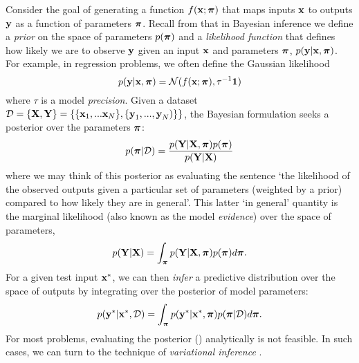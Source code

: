 Consider the goal of generating a function $f(\boldsymbol{\mathbf{x}}; \boldsymbol{\mathbf{\pi}})$ that maps inputs $\boldsymbol{\mathbf{x}}$ to outputs $\boldsymbol{\mathbf{y}}$ as a function of parameters $\boldsymbol{\mathbf{\pi}}$. Recall from  that in Bayesian inference we define a \textit{prior} on the space of parameters $p(\boldsymbol{\mathbf{\pi}})$ and a \textit{likelihood function} that defines how likely we are to observe $\boldsymbol{\mathbf{y}}$ given an input $\boldsymbol{\mathbf{x}}$ and parameters $\boldsymbol{\mathbf{\pi}}$, $p(\boldsymbol{\mathbf{y}} | \boldsymbol{\mathbf{x}}, \boldsymbol{\mathbf{\pi}})$. For example, in regression problems, we often define the Gaussian likelihood
\begin{equation}
	p(\boldsymbol{\mathbf{y}} | \boldsymbol{\mathbf{x}}, \boldsymbol{\mathbf{\pi}}) = \mathcal{N}(f(\boldsymbol{\mathbf{x}}; \boldsymbol{\mathbf{\pi}}),\tau^{-1}\boldsymbol{\mathbf{1}})
\end{equation}
where $\tau$ is a model \textit{precision}. Given a dataset $\mathcal{D} = \{\boldsymbol{\mathbf{X}}, \boldsymbol{\mathbf{Y}}\} = \{\{\boldsymbol{\mathbf{x}}_1, ... \boldsymbol{\mathbf{x}}_N\},\{\boldsymbol{\mathbf{y}}_1, ..., \boldsymbol{\mathbf{y}}_N)\} \}$, the Bayesian formulation seeks a posterior over the parameters $\boldsymbol{\mathbf{\pi}}$:
\begin{equation}
\label{eq:sun_bcnn_param_posterior}
	p(\boldsymbol{\mathbf{\pi}} | \mathcal{D}) = \frac{p(\boldsymbol{\mathbf{Y}}|\boldsymbol{\mathbf{X}}, \boldsymbol{\mathbf{\pi}}) p(\boldsymbol{\mathbf{\pi}})}{p(\boldsymbol{\mathbf{Y}} | \boldsymbol{\mathbf{X}})}
\end{equation}
where we may think of this posterior as evaluating the sentence `the likelihood of the observed outputs given a particular set of parameters (weighted by a prior) compared to how likely they are in general'. This latter `in general' quantity is the marginal likelihood (also known as the model \textit{evidence}) over the space of parameters,
\begin{equation}
	p(\boldsymbol{\mathbf{Y}} | \boldsymbol{\mathbf{X}}) = \int_{\boldsymbol{\mathbf{\pi}}}  p(\boldsymbol{\mathbf{Y}} | \boldsymbol{\mathbf{X}}, \boldsymbol{\mathbf{\pi}}) p(\boldsymbol{\mathbf{\pi}}) d\boldsymbol{\mathbf{\pi}}.
\end{equation}
For a given test input $\boldsymbol{\mathbf{x}}^*$, we can then \textit{infer} a predictive distribution over the space of outputs by integrating over the posterior of model parameters:
\begin{equation}
	p(\boldsymbol{\mathbf{y}}^* | \boldsymbol{\mathbf{x}}^*, \mathcal{D}) = \int_{\boldsymbol{\mathbf{\pi}}}  p(\boldsymbol{\mathbf{y}}^* | \boldsymbol{\mathbf{x}}^*, \boldsymbol{\mathbf{\pi}}) p(\boldsymbol{\mathbf{\pi}} | \mathcal{D}) d\boldsymbol{\mathbf{\pi}}.
\end{equation}
For most problems, evaluating the posterior () analytically is not feasible. In such cases, we can turn to the technique of \textit{variational inference} \citep{Gal2016UncertaintyThesis}.

